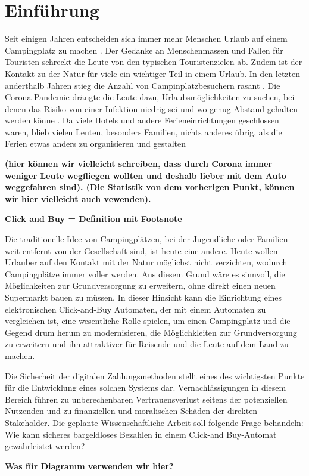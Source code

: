 \section{Einführung}


Seit einigen Jahren entscheiden sich immer mehr Menschen Urlaub auf einem Campingplatz 
zu machen \cite{periodical:ANST}. Der Gedanke an Menschenmassen und Fallen für Touristen 
schreckt die Leute von den typischen Touristenzielen ab. Zudem ist der Kontakt zu der Natur für 
viele ein wichtiger Teil in einem Urlaub. In den letzten anderthalb Jahren stieg die Anzahl von
Campinplatzbesuchern rasant \cite{periodical:UBST}. Die Corona-Pandemie drängte die Leute dazu, 
Urlaubsmöglichkeiten zu suchen, bei denen das Risiko von einer Infektion niedrig sei und wo genug 
Abstand gehalten werden könne \cite{periodical:AUST}. Da viele Hotels und andere Ferieneinrichtungen 
geschlossen waren, blieb vielen Leuten, besonders Familien, nichts anderes übrig, als die Ferien 
etwas anders zu organisieren und gestalten 


\textbf{(hier können wir vielleicht schreiben, dass durch Corona immer weniger Leute wegfliegen wollten und deshalb lieber
mit dem Auto weggefahren sind). (Die Statistik von dem vorherigen Punkt, können wir hier vielleicht auch vewenden).}


\textbf{Click and Buy = Definition mit Footsnote}


Die traditionelle Idee von Campingplätzen, bei der Jugendliche oder Familien weit entfernt von der 
Gesellschaft sind, ist heute eine andere. Heute wollen Urlauber auf den Kontakt mit der Natur
möglichst nicht verzichten, wodurch Campingplätze immer voller werden. Aus diesem Grund wäre es
sinnvoll, die Möglichkeiten zur Grundversorgung zu erweitern, ohne direkt einen neuen Supermarkt
bauen zu müssen. In dieser Hinsicht kann die Einrichtung eines elektronischen Click-and-Buy
Automaten, der mit einem Automaten zu vergleichen ist, eine wesentliche Rolle spielen, um 
einen Campingplatz und die Gegend drum herum zu modernisieren, die Möglichkleiten zur Grundversorgung 
zu erweitern und ihn attraktiver für Reisende und die Leute auf dem Land zu machen.

Die Sicherheit der digitalen Zahlungsmethoden stellt eines des wichtigsten Punkte für die Entwicklung
eines solchen Systems dar. Vernachlässigungen in diesem Bereich führen zu unberechenbaren Vertrauensverlust 
seitens der potenziellen Nutzenden und zu finanziellen und moralischen Schäden der direkten
Stakeholder. Die geplante Wissenschaftliche Arbeit soll folgende Frage behandeln:
Wie kann sicheres bargeldloses Bezahlen in einem Click-and Buy-Automat gewährleistet werden? 

\textbf{Was für Diagramm verwenden wir hier?}
